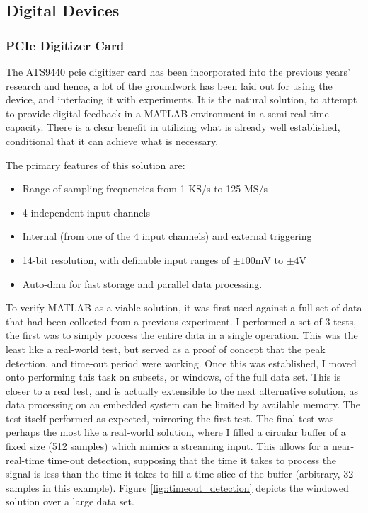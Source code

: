 \subsection{Digital Devices}
\subsubsection{PCIe Digitizer Card}
The ATS9440 \gls{pcie} digitizer card \cite{ATS9440} has been incorporated into the previous years' research and hence, a lot of the groundwork has been laid out for using the device, and interfacing it with experiments. It is the natural solution, to attempt to provide digital feedback in a MATLAB environment in a semi-real-time capacity. There is a clear benefit in utilizing what is already well established, conditional that it can achieve what is necessary.

The primary features of this solution are:
\begin{itemize}
	\item Range of sampling frequencies from 1 KS/s to 125 MS/s
	\item 4 independent input channels
	\item Internal (from one of the 4 input channels) and external triggering
	\item 14-bit resolution, with definable input ranges of $\pm 100 \textrm{mV}$ to $\pm 4 \textrm{V}$
	\item Auto-\gls{dma} for fast storage and parallel data processing.
\end{itemize}

To verify MATLAB as a viable solution, it was first used against a full set of data that had been collected from a previous experiment. I performed a set of 3 tests, the first was to simply process the entire data in a single operation. This was the least like a real-world test, but served as a proof of concept that the peak detection, and time-out period were working. Once this was established, I moved onto performing this task on subsets, or windows, of the full data set. This is closer to a real test, and is actually extensible to the next alternative solution, as data processing on an embedded system can be limited by available memory. The test itself performed as expected, mirroring the first test. The final test was perhaps the most like a real-world solution, where I filled a circular buffer of a fixed size (512 samples) which mimics a streaming input. This allows for a near-real-time time-out detection, supposing that the time it takes to process the signal is less than the time it takes to fill a time slice of the buffer (arbitrary, 32 samples in this example). Figure \ref{fig::timeout_detection} depicts the windowed solution over a large data set.

